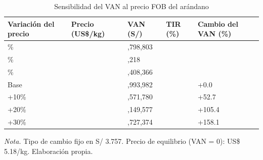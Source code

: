 \begin{table}[H]
\centering
\small
\caption{Sensibilidad del VAN al precio FOB del arándano}
\label{tab:tabla7_sensibilidad_precio}
\begin{tabularx}{\linewidth}{>{\raggedright\arraybackslash}X>{\raggedleft\arraybackslash}X>{\raggedleft\arraybackslash}X>{\raggedleft\arraybackslash}X>{\raggedleft\arraybackslash}X}
\toprule
\textbf{Variación del precio} & \textbf{Precio (US\$/kg)} & \textbf{VAN (S/)} & \textbf{TIR (\%)} & \textbf{Cambio del VAN (\%)} \\
\midrule
-30\% & 4.46 & -1,798,803 & -1.0 & -160.1 \\
-20\% & 5.10 & -195,218 & 10.8 & -106.5 \\
-10\% & 5.74 & 1,408,366 & 19.7 & -53.0 \\
Base & 6.38 & 2,993,982 & 27.0 & +0.0 \\
+10\% & 7.02 & 4,571,780 & 33.4 & +52.7 \\
+20\% & 7.65 & 6,149,577 & 39.2 & +105.4 \\
+30\% & 8.29 & 7,727,374 & 44.5 & +158.1 \\
\bottomrule
\end{tabularx}
\par\vspace{2pt}\parbox{\linewidth}{\footnotesize\textit{Nota.} Tipo de cambio fijo en S/ 3.757. Precio de equilibrio (VAN = 0): US\$ 5.18/kg. Elaboración propia.}
\end{table}
